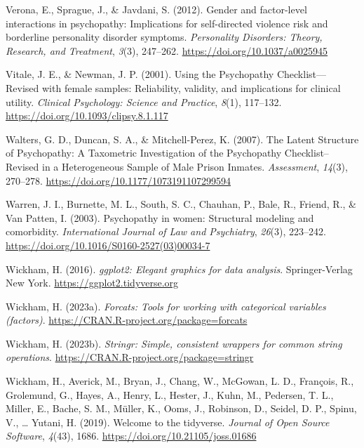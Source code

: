 \documentclass[
  man,floatsintext]{apa7}
\newlength{\cslhangindent}
\newlength{\cslentryspacingunit} %
\newenvironment{CSLReferences}[2] %
 {%
  \setlength{\parindent}{0pt}
  \ifodd #1
  \let\oldpar\par
  \def\par{\hangindent=\cslhangindent\oldpar}
  \fi
  \setlength{\parskip}{#2\cslentryspacingunit}
 }%
 {}
\begin{document}
\begin{CSLReferences}{1}{0}
\leavevmode{}%
Verona, E., Sprague, J., \& Javdani, S. (2012). Gender and factor-level interactions in psychopathy: {Implications} for self-directed violence risk and borderline personality disorder symptoms. \emph{Personality Disorders: Theory, Research, and Treatment}, \emph{3}(3), 247--262. \url{https://doi.org/10.1037/a0025945}

\leavevmode{}%
Vitale, J. E., \& Newman, J. P. (2001). Using the {Psychopathy Checklist}---{Revised} with female samples: {Reliability}, validity, and implications for clinical utility. \emph{Clinical Psychology: Science and Practice}, \emph{8}(1), 117--132. \url{https://doi.org/10.1093/clipsy.8.1.117}

\leavevmode{}%
Walters, G. D., Duncan, S. A., \& Mitchell-Perez, K. (2007). The {Latent Structure} of {Psychopathy}: {A Taxometric Investigation} of the {Psychopathy Checklist}--{Revised} in a {Heterogeneous Sample} of {Male Prison Inmates}. \emph{Assessment}, \emph{14}(3), 270--278. \url{https://doi.org/10.1177/1073191107299594}

\leavevmode{}%
Warren, J. I., Burnette, M. L., South, S. C., Chauhan, P., Bale, R., Friend, R., \& Van Patten, I. (2003). Psychopathy in women: {Structural} modeling and comorbidity. \emph{International Journal of Law and Psychiatry}, \emph{26}(3), 223--242. \url{https://doi.org/10.1016/S0160-2527(03)00034-7}

\leavevmode{}%
Wickham, H. (2016). \emph{ggplot2: Elegant graphics for data analysis}. Springer-Verlag New York. \url{https://ggplot2.tidyverse.org}

\leavevmode{}%
Wickham, H. (2023a). \emph{Forcats: Tools for working with categorical variables (factors)}. \url{https://CRAN.R-project.org/package=forcats}

\leavevmode{}%
Wickham, H. (2023b). \emph{Stringr: Simple, consistent wrappers for common string operations}. \url{https://CRAN.R-project.org/package=stringr}

\leavevmode{}%
Wickham, H., Averick, M., Bryan, J., Chang, W., McGowan, L. D., François, R., Grolemund, G., Hayes, A., Henry, L., Hester, J., Kuhn, M., Pedersen, T. L., Miller, E., Bache, S. M., Müller, K., Ooms, J., Robinson, D., Seidel, D. P., Spinu, V., \ldots{} Yutani, H. (2019). Welcome to the {tidyverse}. \emph{Journal of Open Source Software}, \emph{4}(43), 1686. \url{https://doi.org/10.21105/joss.01686}


\end{CSLReferences}
\end{document}
